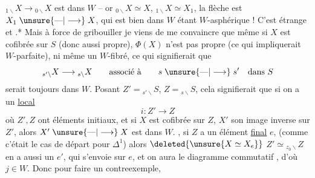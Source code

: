 ${}_{1\backslash}X\longrightarrow{}_{0\backslash}X$ est dans $W$ -- or
${}_{0\backslash}X\simeq X$, ${}_{1\backslash}X\simeq X_1$, la flèche est $X_1\mathrel{\unsure{\text{---}|\longrightarrow}}X$, qui est
bien dans $W$ étant $W$-asphérique ! C'est étrange et
 .* 
Mais à force de gribouiller
je viens de me convaincre que même si
$X$ est cofibrée sur $S$ (donc aussi propre), $\Phi(X)$
n'est pas propre (ce qui impliquerait $W$-parfaite), ni
même un $W$-fibré, ce qui signifierait que
\[
{}_{s'\backslash}X\longrightarrow{}_{s\backslash}X
\qquad\text{associé à}\qquad s\mathrel{\unsure{\text{---}|\longrightarrow}}s'\quad\text{dans }S
\]
serait toujours dans $W$. Posant $Z'={}_{s'\backslash}S$, $Z={}_{s\backslash}S$,
cela signifierait que si on a un \uline{ local}
\[
 i:Z'\longrightarrow Z
\]
où $Z',Z$ ont   éléments initiaux, et si
$X$ est cofibrée sur $Z$, $X'$ son image inverse sur
$Z'$, alors $X'\mathrel{\unsure{\text{---}|\longrightarrow}}X$ est dans $W$.  , si $Z$ a  un
élément \uline{final} $e$, (comme c'était le cas de départ
pour $\Delta^1$) alors $\deleted{\unsure{X\simeq X_e}}$ $Z'\simeq{}_{z_0\backslash}Z$ en a aussi
un $e'$, qui s'envoie sur $e$, et  on aura
le diagramme commutatif
, d'où $j\in W$. Donc pour faire un contreexemple,
